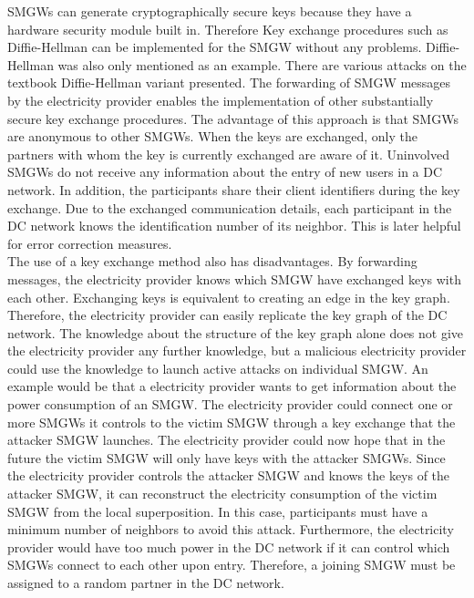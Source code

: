 SMGWs can generate cryptographically secure keys because they have a hardware security module built in. Therefore Key exchange procedures such as Diffie-Hellman can be implemented for the SMGW without any problems. Diffie-Hellman was also only mentioned as an example. There are various attacks on the textbook Diffie-Hellman variant presented.%
The forwarding of SMGW messages by the electricity provider enables the implementation of other substantially secure key exchange procedures. The advantage of this approach is that SMGWs are anonymous to other SMGWs. When the keys are exchanged, only the partners with whom the key is currently exchanged are aware of it. Uninvolved SMGWs do not receive any information about the entry of new users in a DC network. In addition, the participants share their client identifiers during the key exchange. Due to the exchanged communication details, each participant in the DC network knows the identification number of its neighbor. This is later helpful for error correction measures. %
\\The use of a key exchange method also has disadvantages. By forwarding messages, the electricity provider knows which SMGW have exchanged keys with each other. Exchanging keys is equivalent to creating an edge in the key graph.%
Therefore, the electricity provider can easily replicate the key graph of the DC network. The knowledge about the structure of the key graph alone does not give the electricity provider any further knowledge, but a malicious electricity provider could use the knowledge to launch active attacks on individual SMGW. An example would be that a electricity provider wants to get information about the power consumption of an SMGW. The electricity provider could connect one or more SMGWs it controls to the victim SMGW through a key exchange that the attacker SMGW launches. The electricity provider could now hope that in the future the victim SMGW will only have keys with the attacker SMGWs. Since the electricity provider controls the attacker SMGW and knows the keys of the attacker SMGW, it can reconstruct the electricity consumption of the victim SMGW from the local superposition. In this case, participants must have a minimum number of neighbors to avoid this attack. Furthermore, the electricity provider would have too much power in the DC network if it can control which SMGWs connect to each other upon entry. Therefore, a joining SMGW must be assigned to a random partner in the DC network.\\
